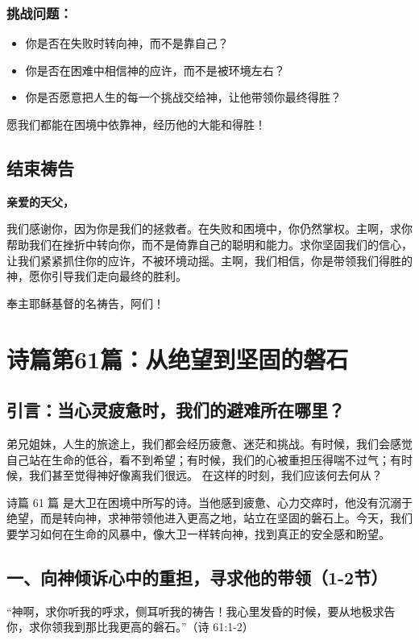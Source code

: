 \documentclass[a4paper, 12pt]{article}
\begin{document}
\subsubsection*{挑战问题：}
\begin{itemize}
    \item 你是否在失败时转向神，而不是靠自己？

    \item 你是否在困难中相信神的应许，而不是被环境左右？

    \item 你是否愿意把人生的每一个挑战交给神，让他带领你最终得胜？

\end{itemize}

愿我们都能在困境中依靠神，经历他的大能和得胜！

\subsection*{结束祷告}
\textbf{亲爱的天父，}

我们感谢你，因为你是我们的拯救者。在失败和困境中，你仍然掌权。主啊，求你帮助我们在挫折中转向你，而不是倚靠自己的聪明和能力。求你坚固我们的信心，让我们紧紧抓住你的应许，不被环境动摇。主啊，我们相信，你是带领我们得胜的神，愿你引导我们走向最终的胜利。

奉主耶稣基督的名祷告，阿们！
\newpage
\section{诗篇第61篇：从绝望到坚固的磐石}
\subsection*{引言：当心灵疲惫时，我们的避难所在哪里？}
\hspace{0.6cm}弟兄姐妹，人生的旅途上，我们都会经历疲惫、迷茫和挑战。有时候，我们会感觉自己站在生命的低谷，看不到希望；有时候，我们的心被重担压得喘不过气；有时候，我们甚至觉得神好像离我们很远。
在这样的时刻，我们应该何去何从？

诗篇 61 篇 是大卫在困境中所写的诗。当他感到疲惫、心力交瘁时，他没有沉溺于绝望，而是转向神，求神带领他进入更高之地，站立在坚固的磐石上。今天，我们要学习如何在生命的风暴中，像大卫一样转向神，找到真正的安全感和盼望。

\subsection*{一、向神倾诉心中的重担，寻求他的带领（1-2节）}
“神啊，求你听我的呼求，侧耳听我的祷告！我心里发昏的时候，要从地极求告你，求你领我到那比我更高的磐石。”（诗 61:1-2）
\end{document}
